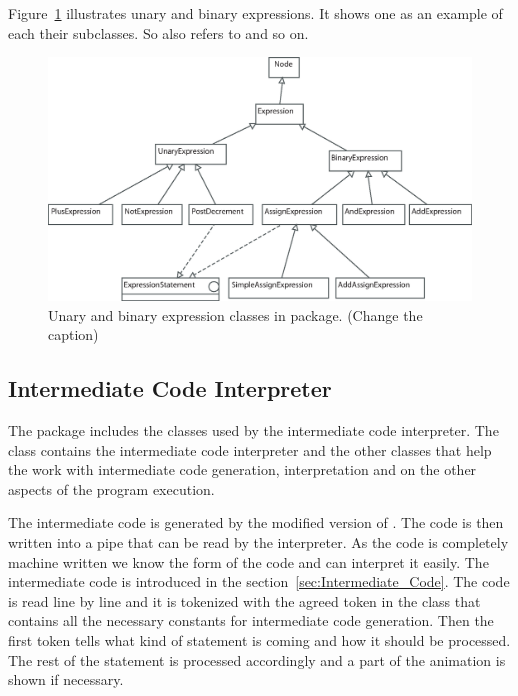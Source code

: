 Figure~\ref{fig:un_and_bin_exp_classes} illustrates unary and
binary expressions. It shows one as an example of each
their subclasses. So  also refers to
 and so on.

\begin{figure}[!htb]
\begin{center}
\includegraphics[width=\textwidth]{images/unary-bin-exps.eps}
\caption{Unary and binary expression classes in  package. (Change the caption)}
\label{fig:un_and_bin_exp_classes}
\end{center}
\end{figure}

\subsection{Intermediate Code Interpreter}
\label{sec:Intermediate_Code_Interpreter}

The package  includes the classes used by the intermediate
code interpreter. The class  contains the intermediate code
interpreter and the other classes that  help the work with intermediate
code generation, interpretation and on the other aspects of the program execution.

The intermediate code is generated by the modified version of \djava{}. The code is
then written into a pipe that can be read by the interpreter. As the code is completely
machine written we know the form of the code and can interpret it easily. The intermediate
code is introduced in the section~\ref{sec:Intermediate_Code}. The code is read
line by line and it is tokenized with the agreed token in the class  that contains
all the necessary constants for intermediate code generation. Then the
first token tells what kind of statement is coming and how it should
be processed. The rest of the statement is processed accordingly and a part of the animation is shown if necessary.

